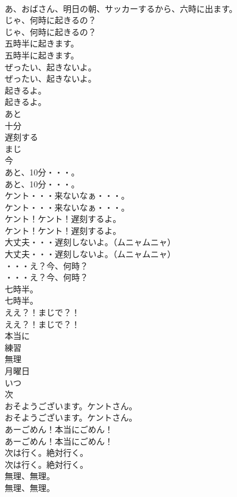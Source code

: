 \documentclass[8pt]{extreport}
\begin{document}
\begin{CJK}{UTF8}{min}
\\	あ、おばさん、明日の朝、サッカーするから、六時に出ます。 
\\	じゃ、何時に起きるの？	
\\	じゃ、何時に起きるの？ 
\\	五時半に起きます。	
\\	五時半に起きます。 
\\	ぜったい、起きないよ。	
\\	ぜったい、起きないよ。 
\\	起きるよ。	
\\	起きるよ。 
\\	あと
\\	十分
\\	遅刻する
\\	まじ
\\	今
\\	あと、10分・・・。	
\\	あと、10分・・・。 
\\	ケント・・・来ないなぁ・・・。	
\\	ケント・・・来ないなぁ・・・。 
\\	ケント！ケント！遅刻するよ。	
\\	ケント！ケント！遅刻するよ。 
\\	大丈夫・・・遅刻しないよ。（ムニャムニャ）	
\\	大丈夫・・・遅刻しないよ。（ムニャムニャ） 
\\	・・・え？今、何時？	
\\	・・・え？今、何時？ 
\\	七時半。	
\\	七時半。 
\\	ええ？！まじで？！	
\\	ええ？！まじで？！ 
\\	本当に
\\	練習
\\	無理
\\	月曜日
\\	いつ
\\	次
\\	おそようございます。ケントさん。	
\\	おそようございます。ケントさん。 
\\	あーごめん！本当にごめん！	
\\	あーごめん！本当にごめん！ 
\\	次は行く。絶対行く。	
\\	次は行く。絶対行く。 
\\	無理、無理。	
\\	無理、無理。 

\end{CJK}
\end{document}
